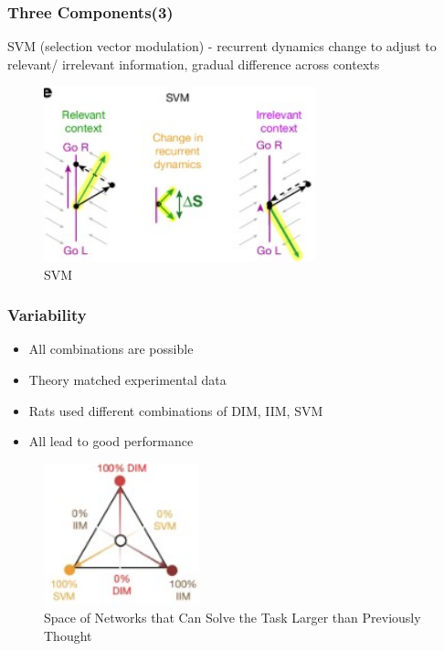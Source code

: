 \documentclass{beamer}
\begin{document}
\begin{frame}
\frametitle{Three Components(3)}
SVM (selection vector modulation) - recurrent dynamics change to adjust to relevant/ irrelevant information, gradual difference across contexts

\begin{figure}[h!]
	\centering
	\includegraphics[width=0.7\textwidth]{svm.jpg}
	\caption{SVM}
    \label{fig:svm}
\end{figure}
\end{frame}

\begin{frame}
\frametitle{Variability}

\begin{itemize}
	\item All combinations are possible
	\item Theory matched experimental data
	\item Rats used different combinations of DIM, IIM, SVM
	\item All lead to good performance
\end{itemize}
\begin{figure}[h!]
	\centering
	\includegraphics[width=0.4\textwidth]{triangle.jpg}
	\caption{Space of Networks that Can Solve the Task Larger than Previously Thought}
    \label{fig:triangle}
\end{figure}
\end{frame}
\end{document}
